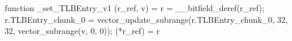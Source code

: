 function _set_TLBEntry_v1 (r_ref, v) = {
    r = __bitfield_deref(r_ref);
    r.TLBEntry_chunk_0 = vector_update_subrange(r.TLBEntry_chunk_0, 32, 32, vector_subrange(v, 0, 0));
    (*r_ref) = r
}
